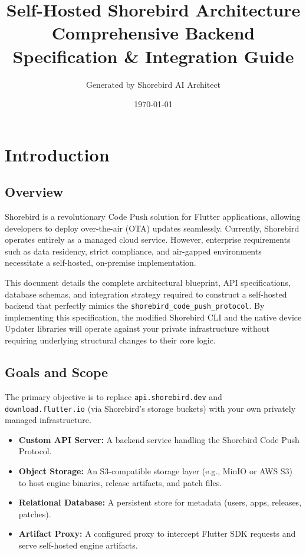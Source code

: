 \documentclass[12pt,a4paper]{article}
\title{\textbf{Self-Hosted Shorebird Architecture} \\ \Large Comprehensive Backend Specification \& Integration Guide}
\author{Generated by Shorebird AI Architect}
\date{\today}
\begin{document}
\maketitle
\tableofcontents
\newpage

\section{Introduction}
\subsection{Overview}
Shorebird is a revolutionary Code Push solution for Flutter applications, allowing developers to deploy over-the-air (OTA) updates seamlessly. Currently, Shorebird operates entirely as a managed cloud service. However, enterprise requirements such as data residency, strict compliance, and air-gapped environments necessitate a self-hosted, on-premise implementation.

This document details the complete architectural blueprint, API specifications, database schemas, and integration strategy required to construct a self-hosted backend that perfectly mimics the \texttt{shorebird\_code\_push\_protocol}. By implementing this specification, the modified Shorebird CLI and the native device Updater libraries will operate against your private infrastructure without requiring underlying structural changes to their core logic.

\subsection{Goals and Scope}
The primary objective is to replace \texttt{api.shorebird.dev} and \texttt{download.flutter.io} (via Shorebird's storage buckets) with your own privately managed infrastructure.
\begin{itemize}
    \item \textbf{Custom API Server:} A backend service handling the Shorebird Code Push Protocol.
    \item \textbf{Object Storage:} An S3-compatible storage layer (e.g., MinIO or AWS S3) to host engine binaries, release artifacts, and patch files.
    \item \textbf{Relational Database:} A persistent store for metadata (users, apps, releases, patches).
    \item \textbf{Artifact Proxy:} A configured proxy to intercept Flutter SDK requests and serve self-hosted engine artifacts.
\end{itemize}
\end{document}
